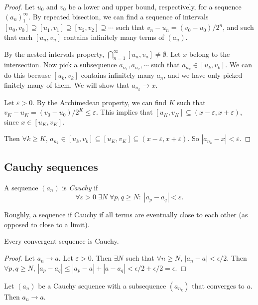 \documentclass[a4paper]{article}
\begin{document}
\begin{proof}
  Let $u_0$ and $v_0$ be a lower and upper bound, respectively, for a sequence $(a_n)_1^{\infty}$. By repeated bisection, we can find a sequence of intervals $[u_0, v_0] \supseteq [u_1, v_1]\supseteq [u_2,v_2] \supseteq\cdots$ such that $v_n - u_n = (v_0 - u_0)/2^n$, and such that each $[u_n, v_n]$ contains infinitely many terms of $(a_n)$.

  By the nested intervals property, $\bigcap_{n = 1}^\infty [u_n, v_n] \neq \emptyset$. Let $x$ belong to the intersection. Now pick a subsequence $a_{n_1}, a_{n_2}, \cdots$ such that $a_{n_k} \in [u_k, v_k]$. We can do this because $[u_k, v_k]$ contains infinitely many $a_n$, and we have only picked finitely many of them. We will show that $a_{n_k} \to x$.

  Let $\varepsilon > 0$. By the Archimedean property, we can find $K$ such that $v_K - u_K = (v_0 - u_0)/2^K \leq \varepsilon$. This implies that $[u_K, v_K] \subseteq (x - \varepsilon, x + \varepsilon)$, since $x\in [u_K, v_K]$.

  Then $\forall k \geq K$, $a_{n_k}\in [u_k, v_k] \subseteq [u_K, v_K] \subseteq (x - \varepsilon, x + \varepsilon)$. So $|a_{n_k} - x| < \varepsilon$.
\end{proof}

\subsection{Cauchy sequences}
\begin{defi}
  A sequence $(a_n)$ is \emph{Cauchy} if
  \[
    \forall \varepsilon > 0\; \exists N\; \forall p, q\geq N:\; |a_p - a_q| < \varepsilon.
  \]
\end{defi}
Roughly, a sequence if Cauchy if all terms are eventually close to each other (as opposed to close to a limit).

\begin{lemma}
  Every convergent sequence is Cauchy.
\end{lemma}

\begin{proof}
  Let $a_n \to a$. Let $\varepsilon > 0$. Then $\exists N$ such that $\forall n \geq N$, $|a_n - a| < \epsilon/2$. Then $\forall p, q\geq N$, $|a_p - a_q| \leq |a_p - a| + |a - a_q| < \epsilon/2 + \epsilon/2 = \epsilon$.
\end{proof}

\begin{lemma}
  Let $(a_n)$ be a Cauchy sequence with a subsequence $(a_{n_k})$ that converges to $a$. Then $a_n\to a$.
\end{lemma}
\end{document}
